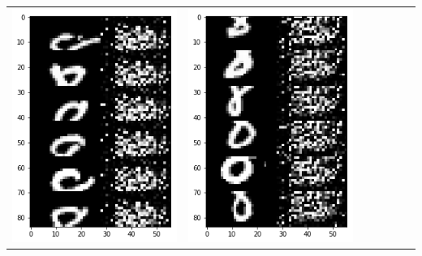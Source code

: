 \documentclass[12pt]{report} %
\begin{document}
\begin{tabular}{m{0.7cm}m{2.4cm}m{2.4cm}m{2.4cm}m{2.4cm}m{2.4cm}m{2.4cm}}
	\includegraphics[scale=0.3]{pictures/M2_8_up.png} & \includegraphics[scale=0.3]{pictures/M2_8_down.png}\\

\end{tabular}
\end{document}
